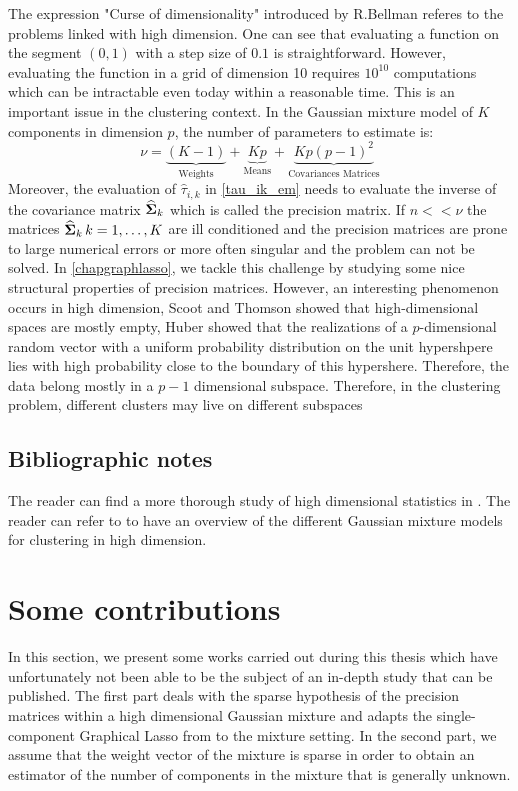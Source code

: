 The expression "Curse of dimensionality" introduced by R.Bellman  referes to the problems linked with high dimension. One can see that evaluating a function on the segment $(0,1)$ with a step size of $0.1$ is straightforward. However, evaluating the function in a grid of dimension 10 requires $10^{10}$ computations which can be intractable even today within a reasonable time. This is an important issue in the clustering context. In the Gaussian mixture model of $K$ components in dimension $p$, the number of parameters to estimate is:
\begin{equation}
   \nu = \underbrace{(K-1)}_\text{Weights}+ \underbrace{Kp}_\text{Means} + \underbrace{Kp(p-1)^2}_\text{Covariances Matrices}
 \end{equation}
 Moreover, the evaluation of $\hat\tau_{i,k}$ in \cref{tau_ik_em} needs to evaluate the inverse of the covariance matrix $\widehat{\boldsymbol\Sigma}_k$ which is called the precision matrix. If $n<<\nu$ the matrices $\widehat{\boldsymbol\Sigma}_k\, k=1,\dots,K$ are ill conditioned and the precision matrices are prone to large numerical errors or more often singular and the problem can not be solved. In \cref{chapgraphlasso}, we tackle this challenge by studying some nice structural properties of precision matrices.
However,  an interesting phenomenon occurs in high dimension, Scoot and Thomson  showed that high-dimensional spaces are mostly empty, Huber  showed that the realizations of a $p$-dimensional random vector with a uniform probability distribution on the unit hypershpere lies with high probability close to the boundary of this hypershere. Therefore, the data belong mostly in a $p-1$ dimensional subspace. Therefore, in the clustering problem, different clusters may live on different subspaces 
\subsection{Bibliographic notes}
The reader can find a more thorough study of high dimensional statistics in \cite{giraud2014introduction}.  The reader can refer to \citep{bouveyron:hal-00750909} to have an overview of the different Gaussian mixture models for clustering in high dimension.

\section{Some contributions}
In this section, we present some works carried out during this thesis which have unfortunately not been able to be the subject of an in-depth study that can be published. The first part deals with the sparse hypothesis of the precision matrices within a high dimensional Gaussian mixture and adapts the single-component Graphical Lasso from \citep{glasso07} to the mixture setting. In the second part, we assume that the weight vector of the mixture is sparse in order to obtain an estimator of the number of components in the mixture that is generally unknown. 

